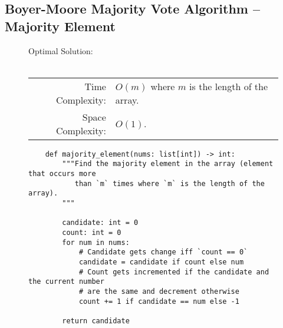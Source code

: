
\subsection{Boyer-Moore Majority Vote Algorithm -- Majority Element}

\begin{figure}[H]
    Optimal Solution:\\\\
    \begin{tabular}{rl}
        Time Complexity:& \(O(m)\) where \(m\) is the length of the array.\\
        Space Complexity:& \(O(1)\).
    \end{tabular}
\end{figure}

\begin{figure}[H]
    \centering
    \begin{verbatim}
    def majority_element(nums: list[int]) -> int:
        """Find the majority element in the array (element that occurs more
           than `m` times where `m` is the length of the array).
        """

        candidate: int = 0
        count: int = 0
        for num in nums:
            # Candidate gets change iff `count == 0`
            candidate = candidate if count else num
            # Count gets incremented if the candidate and the current number
            # are the same and decrement otherwise
            count += 1 if candidate == num else -1

        return candidate
    \end{verbatim}
\end{figure}
